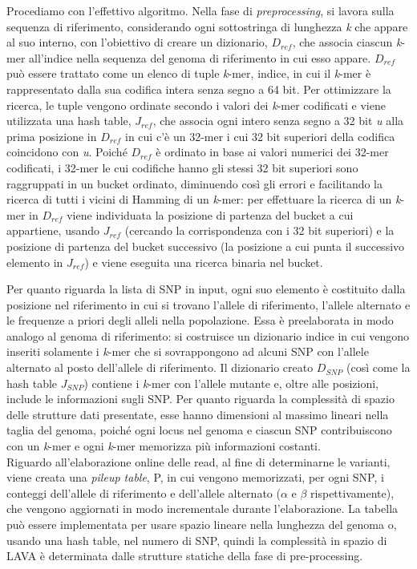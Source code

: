\documentclass[../main.tex]{subfiles}
\begin{document}
\noindent
Procediamo con l'effettivo algoritmo. Nella fase di \textit{preprocessing}, si lavora sulla sequenza di riferimento, considerando ogni sottostringa di lunghezza \textit{k} che appare al suo interno, con l'obiettivo di creare un dizionario, $D_{ref}$, che associa ciascun \textit{k}-mer all'indice nella sequenza del genoma di riferimento in cui esso appare. $D_{ref}$ può essere trattato come un elenco di tuple \textlangle \textit{k}-mer, indice\textrangle, in cui il \textit{k}-mer è rappresentato dalla sua codifica intera senza segno a 64 bit. Per ottimizzare la ricerca, le tuple vengono ordinate secondo i valori dei \textit{k}-mer codificati e viene utilizzata una hash table, $J_{ref}$, che associa ogni intero senza segno a 32 bit \textit{u} alla prima posizione in $D_{ref}$ in cui c'è un 32-mer i cui 32 bit superiori della codifica coincidono con \textit{u}. Poiché $D_{ref}$ è ordinato in base ai valori numerici dei 32-mer codificati, i 32-mer le cui codifiche hanno gli stessi 32 bit superiori sono raggruppati in un bucket ordinato, diminuendo così gli errori e facilitando la ricerca di tutti i vicini di Hamming di un \textit{k}-mer: per effettuare la ricerca di un \textit{k}-mer in $D_{ref}$ viene individuata la posizione di partenza del bucket a cui appartiene, usando $J_{ref}$ (cercando la corrispondenza con i 32 bit superiori) e la posizione di partenza del bucket successivo (la posizione a cui punta il successivo elemento in $J_{ref}$) e viene eseguita una ricerca binaria nel bucket.

Per quanto riguarda la lista di SNP in input, ogni suo elemento è costituito dalla posizione nel riferimento in cui si trovano l'allele di riferimento, l'allele alternato e le frequenze a priori degli alleli nella popolazione. Essa è preelaborata in modo analogo al genoma di riferimento: si costruisce un dizionario indice in cui vengono inseriti solamente i \textit{k}-mer che si sovrappongono ad alcuni SNP con l'allele alternato al posto dell'allele di riferimento. Il dizionario creato $D_{SNP}$ (così come la hash table $J_{SNP}$) contiene i \textit{k}-mer con l'allele mutante e, oltre alle posizioni, include le informazioni sugli SNP. 
Per quanto riguarda la complessità di spazio delle strutture dati presentate, esse hanno dimensioni al massimo lineari nella taglia del genoma, poiché ogni locus nel genoma e ciascun SNP contribuiscono con un \textit{k}-mer e ogni \textit{k}-mer memorizza più informazioni costanti.\\

\noindent
Riguardo all'elaborazione online delle read, al fine di determinarne le varianti, viene creata una \textit{pileup table}, P, in cui vengono memorizzati, per ogni SNP, i conteggi dell'allele di riferimento e dell'allele alternato ($\alpha$ e $\beta$ rispettivamente), che vengono aggiornati in modo incrementale durante l'elaborazione. La tabella può essere implementata per usare spazio lineare nella lunghezza del genoma o, usando una hash table, nel numero di SNP, quindi la complessità in spazio di LAVA è determinata dalle strutture statiche della fase di pre-processing.
\end{document}
